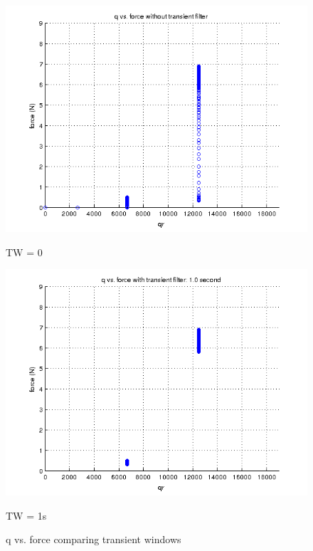 \begin{figure}[h]
  \centering
  \begin{minipage}[b]{0.4\textwidth}
    \includegraphics[width=\textwidth]{Figure/stepUnfilt.png}
    \caption{TW = 0}
  \label{Fig:qFUnfilt}
  \end{minipage}
  \hfill
  \begin{minipage}[b]{0.4\textwidth}
    \includegraphics[width=\textwidth]{Figure/stepfilt.png}
    \caption{TW = 1s}
    \label{Fig:qFfilt}
  \end{minipage}
\caption{q vs. force comparing transient windows}
\label{Fig:qF}

\end{figure}

